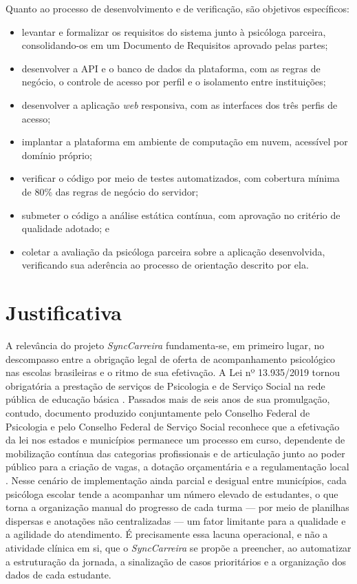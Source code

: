 Quanto ao processo de desenvolvimento e de verificação, são objetivos específicos:

\begin{itemize}
    \item levantar e formalizar os requisitos do sistema junto à psicóloga parceira, consolidando-os em um Documento de Requisitos aprovado pelas partes;
    \item desenvolver a API e o banco de dados da plataforma, com as regras de negócio, o controle de acesso por perfil e o isolamento entre instituições;
    \item desenvolver a aplicação \textit{web} responsiva, com as interfaces dos três perfis de acesso;
    \item implantar a plataforma em ambiente de computação em nuvem, acessível por domínio próprio;
    \item verificar o código por meio de testes automatizados, com cobertura mínima de 80\% das regras de negócio do servidor;
    \item submeter o código a análise estática contínua, com aprovação no critério de qualidade adotado; e
    \item coletar a avaliação da psicóloga parceira sobre a aplicação desenvolvida, verificando sua aderência ao processo de orientação descrito por ela.
\end{itemize}

\section{Justificativa}\label{sec:justificativa}

A relevância do projeto \textit{SyncCarreira} fundamenta-se, em primeiro lugar, no descompasso entre a obrigação legal de oferta de acompanhamento psicológico nas escolas brasileiras e o ritmo de sua efetivação. A Lei nº 13.935/2019 tornou obrigatória a prestação de serviços de Psicologia e de Serviço Social na rede pública de educação básica \cite{brasil2019lei13935}. Passados mais de seis anos de sua promulgação, contudo, documento produzido conjuntamente pelo Conselho Federal de Psicologia e pelo Conselho Federal de Serviço Social reconhece que a efetivação da lei nos estados e municípios permanece um processo em curso, dependente de mobilização contínua das categorias profissionais e de articulação junto ao poder público para a criação de vagas, a dotação orçamentária e a regulamentação local \cite{cfpcfess2022}. Nesse cenário de implementação ainda parcial e desigual entre municípios, cada psicóloga escolar tende a acompanhar um número elevado de estudantes, o que torna a organização manual do progresso de cada turma --- por meio de planilhas dispersas e anotações não centralizadas --- um fator limitante para a qualidade e a agilidade do atendimento. É precisamente essa lacuna operacional, e não a atividade clínica em si, que o \textit{SyncCarreira} se propõe a preencher, ao automatizar a estruturação da jornada, a sinalização de casos prioritários e a organização dos dados de cada estudante.

